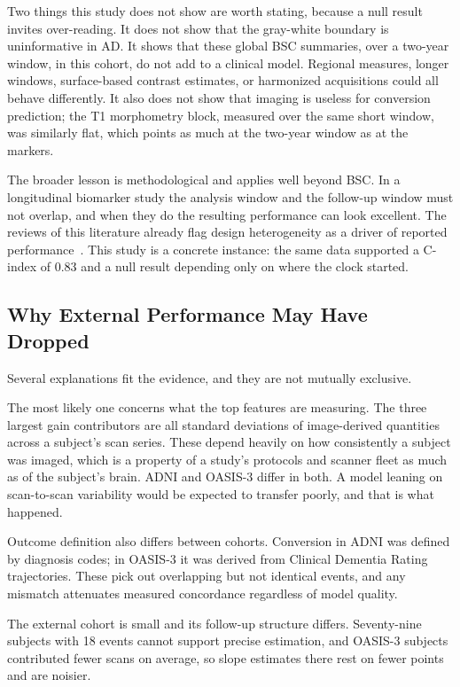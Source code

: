 \documentclass[blue]{ludusofficial}  %
\begin{document}
Two things this study does not show are worth stating, because a null result invites over-reading. It does not show that the gray-white boundary is uninformative in AD. It shows that these global BSC summaries, over a two-year window, in this cohort, do not add to a clinical model. Regional measures, longer windows, surface-based contrast estimates, or harmonized acquisitions could all behave differently. It also does not show that imaging is useless for conversion prediction; the T1 morphometry block, measured over the same short window, was similarly flat, which points as much at the two-year window as at the markers.

The broader lesson is methodological and applies well beyond BSC. In a longitudinal biomarker study the analysis window and the follow-up window must not overlap, and when they do the resulting performance can look excellent. The reviews of this literature already flag design heterogeneity as a driver of reported performance~\cite{ansart2021predicting,grueso2021machine}. This study is a concrete instance: the same data supported a C-index of 0.83 and a null result depending only on where the clock started.

\subsection{Why External Performance May Have Dropped}

Several explanations fit the evidence, and they are not mutually exclusive.

The most likely one concerns what the top features are measuring. The three largest gain contributors are all standard deviations of image-derived quantities across a subject's scan series. These depend heavily on how consistently a subject was imaged, which is a property of a study's protocols and scanner fleet as much as of the subject's brain. ADNI and OASIS-3 differ in both. A model leaning on scan-to-scan variability would be expected to transfer poorly, and that is what happened.

Outcome definition also differs between cohorts. Conversion in ADNI was defined by diagnosis codes; in OASIS-3 it was derived from Clinical Dementia Rating trajectories. These pick out overlapping but not identical events, and any mismatch attenuates measured concordance regardless of model quality.

The external cohort is small and its follow-up structure differs. Seventy-nine subjects with 18 events cannot support precise estimation, and OASIS-3 subjects contributed fewer scans on average, so slope estimates there rest on fewer points and are noisier.
\end{document}
